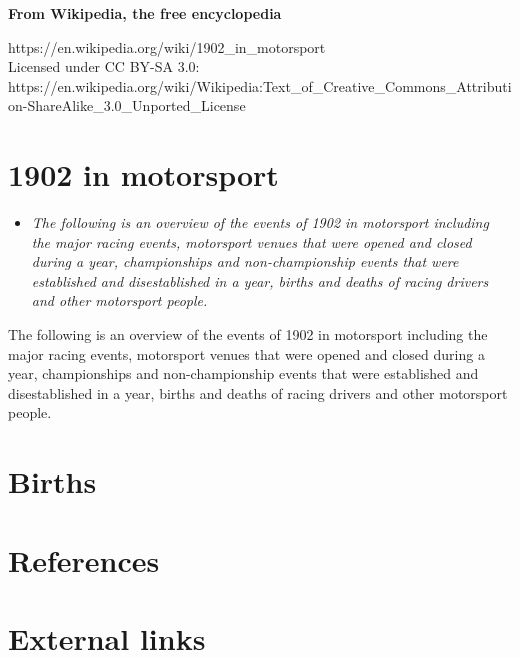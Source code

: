 \textbf{From Wikipedia, the free encyclopedia}

https://en.wikipedia.org/wiki/1902\_in\_motorsport\\
Licensed under CC BY-SA 3.0:\\
https://en.wikipedia.org/wiki/Wikipedia:Text\_of\_Creative\_Commons\_Attribution-ShareAlike\_3.0\_Unported\_License

\section{1902 in motorsport}\label{in-motorsport}

\begin{itemize}
\item
  \emph{The following is an overview of the events of 1902 in motorsport
  including the major racing events, motorsport venues that were opened
  and closed during a year, championships and non-championship events
  that were established and disestablished in a year, births and deaths
  of racing drivers and other motorsport people.}
\end{itemize}

The following is an overview of the events of 1902 in motorsport
including the major racing events, motorsport venues that were opened
and closed during a year, championships and non-championship events that
were established and disestablished in a year, births and deaths of
racing drivers and other motorsport people.

\section{Births}\label{births}

\section{References}\label{references}

\section{External links}\label{external-links}
